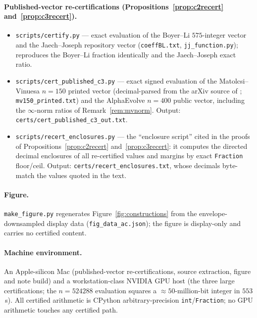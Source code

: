 \documentclass[11pt]{article}
\theoremstyle{remark}
\begin{document}
\paragraph{Published-vector re-certifications
(Propositions~\ref{prop:c2recert} and~\ref{prop:c3recert}).}
\begin{itemize}
\item \texttt{scripts/certify.py} --- exact evaluation of the Boyer--Li
$575$-integer vector and the Jaech--Joseph repository vector
(\texttt{coeffBL.txt}, \texttt{jj\_function.py}); reproduces the Boyer--Li
fraction identically and the Jaech--Joseph exact ratio.
\item \texttt{scripts/cert\_published\_c3.py} --- exact signed evaluation of
the Matolcsi--Vinuesa $n=150$ printed vector (decimal-parsed from the arXiv
source of \cite{MV10}; \texttt{mv150\_printed.txt}) and the AlphaEvolve
$n=400$ public vector, including the $\infty$-norm ratios of
Remark~\ref{rem:mvnorm}. Output: \texttt{certs/cert\_published\_c3\_out.txt}.
\item \texttt{scripts/recert\_enclosures.py} --- the ``enclosure script''
cited in the proofs of Propositions~\ref{prop:c2recert}
and~\ref{prop:c3recert}: it computes the directed decimal enclosures of all
re-certified values and margins by exact \texttt{Fraction} floor/ceil.
Output: \texttt{certs/recert\_enclosures.txt}, whose decimals byte-match the
values quoted in the text.
\end{itemize}

\paragraph{Figure.} \texttt{make\_figure.py} regenerates
Figure~\ref{fig:constructions} from the envelope-downsampled display data
(\texttt{fig\_data\_ac.json}); the figure is display-only and carries no
certified content.

\paragraph{Machine environment.} An Apple-silicon Mac (published-vector
re-certifications, source extraction, figure and note build) and a
workstation-class NVIDIA GPU host (the three large certifications; the
$n = 524288$ evaluation squares a $\approx 50$-million-bit integer in
$553$\,s). All certified arithmetic is CPython arbitrary-precision
\texttt{int}/\texttt{Fraction}; no GPU arithmetic touches any certified
path.
\end{document}
